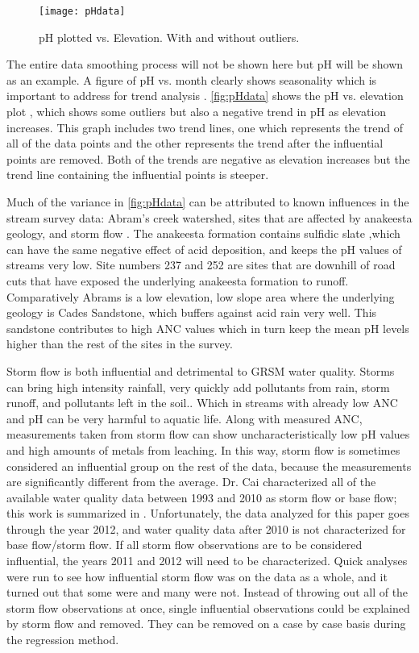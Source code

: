 \begin{figure}[h!]
\centering
    \texttt{[image: pHdata]}\\
    \caption{pH plotted vs. Elevation. With and without outliers.}
    \label{fig:pHdata}
\end{figure}

The entire data smoothing process will not be shown here but pH will be shown as an example.
A figure of pH vs. month clearly shows seasonality which is important to address for trend analysis \citep{helsel1992statistical}.
\autoref{fig:pHdata} shows the pH vs. elevation plot , which shows some outliers but also a negative trend in pH as elevation increases.
This graph includes two trend lines, one which represents the trend of all of the data points and the other represents the trend after the influential points are removed. 
Both of the trends are negative as elevation increases but the trend line containing the influential points is steeper. 

Much of the variance in \autoref{fig:pHdata} can be attributed to known influences in the stream survey data: Abram's creek watershed, sites that are affected by anakeesta geology, and storm flow \citep{neff2012influence}.  
The anakeesta formation contains sulfidic slate ,which can have the same negative effect of acid deposition,  and keeps the pH values of streams very low.
Site numbers 237 and 252 are sites that are downhill of road cuts that have exposed the underlying anakeesta formation to runoff.  
Comparatively Abrams is a low elevation, low slope area where the underlying geology is Cades Sandstone, which buffers against acid rain very well. 
This sandstone contributes to high ANC values which in turn keep the mean pH levels higher than the rest of the sites in the survey. 

Storm flow is both influential and detrimental  to GRSM water quality. 
Storms can bring high intensity rainfall, very quickly add pollutants from rain, storm runoff, and pollutants left in the soil.. 
Which in streams with already low ANC and pH can be very harmful to aquatic life.
Along with measured ANC, measurements taken from storm flow can show uncharacteristically low pH values and high amounts of metals from leaching. 
In this way, storm flow is sometimes considered an influential group on the rest of the data, because the measurements are significantly different from the average. 
Dr. Cai characterized all of the available water quality data between 1993 and 2010 as storm flow or base flow; this work is summarized in \citet{cai2013}. 
Unfortunately, the data analyzed for this paper goes through the year 2012, and water quality data after 2010 is not characterized for base flow/storm flow. 
If all storm flow observations are to be considered influential, the years 2011 and 2012 will need to be characterized. 
Quick analyses were run to see how influential storm flow was on the data as a whole, and it turned out that some were and many were not. 
Instead of throwing out all of the storm flow observations at once, single influential observations could be explained by storm flow and removed. 
They can be removed on a case by case basis during the regression method.

